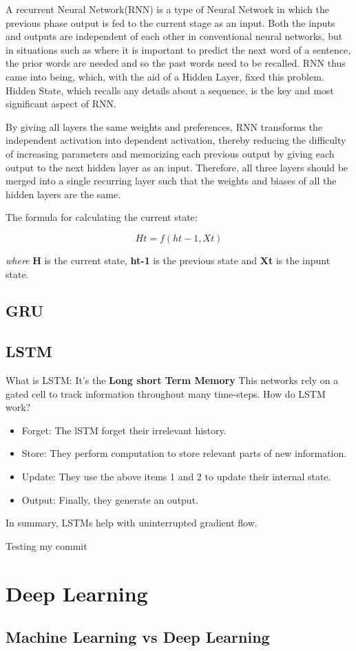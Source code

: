 A recurrent Neural Network(RNN) is a type of Neural Network in which the previous phase output is fed to the current stage as an input. Both the inputs and outputs are independent of each other in conventional neural networks, but in situations such as where it is important to predict the next word of a sentence, the prior words are needed and so the past words need to be recalled. RNN thus came into being, which, with the aid of a Hidden Layer, fixed this problem. Hidden State, which recalls any details about a sequence, is the key and most significant aspect of RNN.\cite{jain1999recurrent}

By giving all layers the same weights and preferences, RNN transforms the independent activation into dependent activation, thereby reducing the difficulty of increasing parameters and memorizing each previous output by giving each output to the next hidden layer as an input.
Therefore, all three layers should be merged into a single recurring layer such that the weights and biases of all the hidden layers are the same.

The formula for calculating the current state:

\[Ht = f(ht-1, Xt)\]

\textit{where} \textbf{H} is the current state, \textbf{ht-1} is the previous state and \textbf{Xt} is the inpunt state.

\subsection{GRU}  %
\subsection{LSTM}
What is LSTM: It's the \textbf{Long short Term Memory} This networks rely on a gated cell to track information throughout many time-steps. How do LSTM work?

\begin{itemize}
	\item Forget: The lSTM forget their irrelevant history.
	
	
	\item Store: They perform computation to store relevant parts of new information.
	
	
	\item Update: They use the above items 1 and 2 to update their internal state.
	
	
	\item Output: Finally, they generate an output.
\end{itemize}

In summary, LSTMs help with uninterrupted gradient flow.

Testing my commit

\section{Deep Learning}
\subsection{Machine Learning vs Deep Learning}
